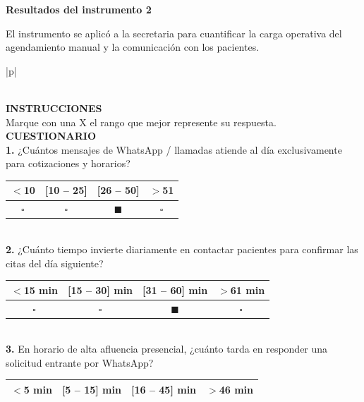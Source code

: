 
\textbf{Resultados del instrumento 2}

El instrumento se aplicó a la secretaria para cuantificar la carga operativa del agendamiento manual y la comunicación con los pacientes.

{\fontsize{10}{12}\selectfont
\begin{longtable}{|p{\dimexpr{}\arrayrulewidth\relax}|}
\caption{Instrumento 2 — Encuesta a la secretaria del Centro Odontológico Bellidental}
\label{tab:instrumento2}\\
\hline
{}\textbf{INSTRUCCIONES} \\
\hline
Marque con una X el rango que mejor represente su respuesta. \\
\hline
{}\textbf{CUESTIONARIO} \\
\hline
\textbf{1.} ¿Cuántos mensajes de WhatsApp / llamadas atiende al día exclusivamente para cotizaciones y horarios? \\[2pt]
\begin{tabular}{|c|c|c|c|}
\hline
\textbf{$<$10} & \textbf{[10 -- 25]} & \textbf{[26 -- 50]} & \textbf{$>$51} \\ \hline
$\square$ & $\square$ & $\blacksquare$ & $\square$ \\ \hline
\end{tabular} \\
\hline
\textbf{2.} ¿Cuánto tiempo invierte diariamente en contactar pacientes para confirmar las citas del día siguiente? \\[2pt]
\begin{tabular}{|c|c|c|c|}
\hline
\textbf{$<$15 min} & \textbf{[15 -- 30] min} & \textbf{[31 -- 60] min} & \textbf{$>$61 min} \\ \hline
$\square$ & $\square$ & $\blacksquare$ & $\square$ \\ \hline
\end{tabular} \\
\hline
\textbf{3.} En horario de alta afluencia presencial, ¿cuánto tarda en responder una solicitud entrante por WhatsApp? \\[2pt]
\begin{tabular}{|c|c|c|c|}
\hline
\textbf{$<$5 min} & \textbf{[5 -- 15] min} & \textbf{[16 -- 45] min} & \textbf{$>$46 min} \\ \hline

\end{tabular}
\end{longtable}}
